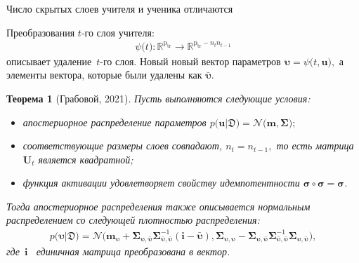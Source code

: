 \documentclass[10pt,pdf,hyperref={unicode}]{beamer}
\newtheorem{rustheorem}{Теорема}
\begin{document}
\begin{frame}{Число скрытых слоев учителя и ученика отличаются}

Преобразования $t$-го слоя учителя:
\[
\begin{aligned}
\psi\bigr(t\bigr) : \mathbb{R}^{\text{p}_{\text{tr}}} \to \mathbb{R}^{\text{p}_{\text{tr}}-n_tn_{t-1}}
\end{aligned}
\]
описывает удаление~$t$-го слоя. Новый новый вектор параметров $\bm{\upsilon} = \psi\bigr(t, \mathbf{u}\bigr),$ а элементы вектора, которые были удалены как $\bar{\bm{\upsilon}}.$

\begin{rustheorem}[Грабовой, 2021]
Пусть выполняются следующие условия:
\begin{itemize}
\item апостериорное распределение параметров $p\bigr(\mathbf{u}|\mathfrak{D}\bigr) = \mathcal{N}\bigr(\mathbf{m}, \bm{\Sigma}\bigr);$
\item соответствующие размеры слоев совпадают, $n_t=n_{t-1},$ то есть матрица $\mathbf{U}_t$ является квадратной;
\item функция активации удовлетворяет свойству идемпотентности $\bm{\sigma} \circ \bm{\sigma} = \bm{\sigma}$.
\end{itemize}
Тогда апостериорное распределения также описывается нормальным распределением со следующей плотностью распределения:
\[
\label{eq:ap:5}
\begin{aligned}
p\bigr(\bm{\upsilon}|\mathfrak{D}\bigr) = \mathcal{N}\bigr(\mathbf{m}_{\bm{\upsilon}}+\bm{\Sigma}_{\bm{\upsilon},\bar{\bm{\upsilon}}} \bm{\Sigma}_{\bar{\bm{\upsilon}},\bar{\bm{\upsilon}}}^{-1} \left(\mathbf{i} - \bar{\bm{\upsilon}}\right), \bm{\Sigma}_{\bm{\upsilon},\bm{\upsilon}} - \bm{\Sigma}_{\bm{\upsilon},\bar{\bm{\upsilon}}}\bm{\Sigma}_{\bar{\bm{\upsilon}},\bar{\bm{\upsilon}}}^{-1}\bm{\Sigma}_{\bm{\upsilon},\bar{\bm{\upsilon}}}\bigr),
\end{aligned}
\]
где~$\mathbf{i}$~ единичная матрица преобразована в вектор.
\end{rustheorem}

\end{frame}
\end{document}
